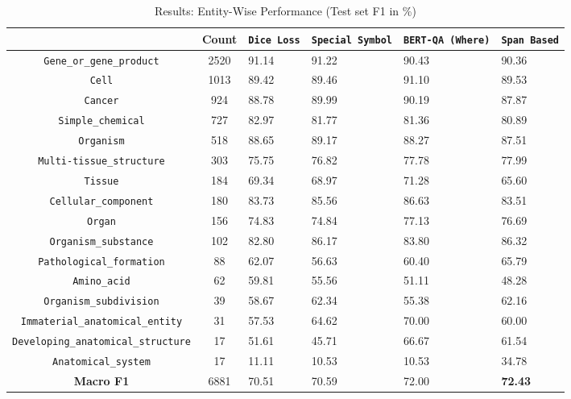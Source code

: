 \begin{table}[h!]
\centering
\begin{tabular}{|c|c|p{4em}|p{4em}|p{4em}|p{4em}|}\hline
	 & Count & \texttt{Dice Loss} & \texttt{Special Symbol} & \texttt{BERT-QA (Where)} & \texttt{Span Based}\\\hline
	\texttt{Gene\_or\_gene\_product} & 2520 & 91.14 & 91.22 & 90.43 & 90.36\\\hline
\texttt{Cell} & 1013 & 89.42 & 89.46 & 91.10 & 89.53\\\hline
\texttt{Cancer} & 924 & 88.78 & 89.99 & 90.19 & 87.87\\\hline
\texttt{Simple\_chemical} & 727 & 82.97 & 81.77 & 81.36 & 80.89\\\hline
\texttt{Organism} & 518 & 88.65 & 89.17 & 88.27 & 87.51\\\hline
\texttt{Multi-tissue\_structure} & 303 & 75.75 & 76.82 & 77.78 & 77.99\\\hline
\texttt{Tissue} & 184 & 69.34 & 68.97 & 71.28 & 65.60\\\hline
\texttt{Cellular\_component} & 180 & 83.73 & 85.56 & 86.63 & 83.51\\\hline
\texttt{Organ} & 156 & 74.83 & 74.84 & 77.13 & 76.69\\\hline
\texttt{Organism\_substance} & 102 & 82.80 & 86.17 & 83.80 & 86.32\\\hline
\texttt{Pathological\_formation} & 88 & 62.07 & 56.63 & 60.40 & 65.79\\\hline
\texttt{Amino\_acid} & 62 & 59.81 & 55.56 & 51.11 & 48.28\\\hline
\texttt{Organism\_subdivision} & 39 & 58.67 & 62.34 & 55.38 & 62.16\\\hline
\texttt{Immaterial\_anatomical\_entity} & 31 & 57.53 & 64.62 & 70.00 & 60.00\\\hline
\texttt{Developing\_anatomical\_structure} & 17 & 51.61 & 45.71 & 66.67 & 61.54\\\hline
\texttt{Anatomical\_system} & 17 & 11.11 & 10.53 & 10.53 & 34.78\\\hline
\textbf{Macro F1} & 6881 & 70.51 & 70.59 & 72.00 & \textbf{72.43}\\\hline
	\end{tabular}
    \caption{Results: Entity-Wise Performance (Test set F1 in \%)}
    \label{tab:res_entity_wise}
\end{table}


